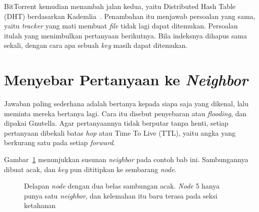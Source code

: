 BitTorrent kemudian menambah jalan kedua, yaitu Distributed Hash Table (DHT)
berdasarkan Kademlia~\cite{maymounkov2002kademlia}. Penambahan itu menjawab
persoalan yang sama, yaitu \textit{tracker} yang mati membuat \textit{file} tidak lagi
dapat ditemukan. Persoalan itulah yang menimbulkan pertanyaan berikutnya. Bila
indeksnya dihapus sama sekali, dengan cara apa sebuah \textit{key} masih dapat
ditemukan.

\section{Menyebar Pertanyaan ke \textit{Neighbor}}

Jawaban paling sederhana adalah bertanya kepada siapa saja yang dikenal, lalu
meminta mereka bertanya lagi. Cara itu disebut penyebaran atau
\textit{flooding}, dan dipakai Gnutella. Agar pertanyaannya tidak berputar
tanpa henti, setiap pertanyaan dibekali batas \textit{hop} atau Time To Live (TTL),
yaitu angka yang berkurang satu pada setiap \textit{forward}.

Gambar~\ref{fig:tetangga-acak} menunjukkan susunan \textit{neighbor} pada contoh bab
ini. Sambungannya dibuat acak, dan \textit{key} pun dititipkan ke sembarang \textit{node}.

\begin{figure}[htbp]
  \centering
  \caption{Delapan \textit{node} dengan dua belas sambungan acak. \textit{Node} 5 hanya punya
    satu \textit{neighbor}, dan kelemahan itu baru terasa pada seksi ketahanan}
  \label{fig:tetangga-acak}
\end{figure}

